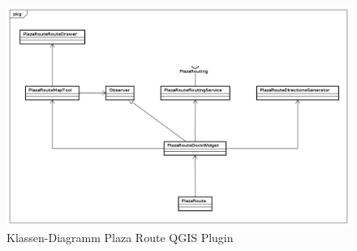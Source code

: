 \begin{figure}[th]
\centering
\includegraphics[width=1.0\linewidth]{projectdoc/img/class_diagram_plaza_route_qgis_plugin}
\caption[Klassen-Diagramm Plaza Route QGIS Plugin]{Klassen-Diagramm Plaza Route QGIS Plugin}
\label{fig:class_diagram_plaza_route_qgis_plugin}
\end{figure}

